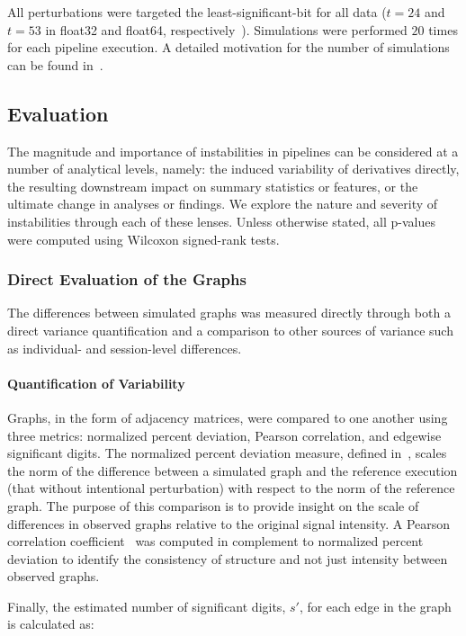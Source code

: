 \documentclass[fleqn,10pt]{SelfArx} %
\begin{document}
All perturbations were targeted the least-significant-bit for all data ($t=24$ and $t=53$ in float32 and float64,
respectively~\cite{Denis2016-wo}). Simulations were performed $20$ times for each pipeline execution. A detailed
motivation for the number of simulations can be found in~\cite{Sohier2018-ts}.

\subsection*{Evaluation}

The magnitude and importance of instabilities in pipelines can be considered at a number of analytical levels, namely:
the induced variability of derivatives directly, the resulting downstream impact on summary statistics or features, or
the ultimate change in analyses or findings. We explore the nature and severity of instabilities through each of these
lenses. Unless otherwise stated, all p-values were computed using Wilcoxon signed-rank tests.

\subsubsection*{Direct Evaluation of the Graphs}

The differences between simulated graphs was measured directly through both a direct variance quantification and a
comparison to other sources of variance such as individual- and session-level differences.

\paragraph{Quantification of Variability}
Graphs, in the form of adjacency matrices, were compared to one another using three metrics: normalized percent
deviation, Pearson correlation, and edgewise significant digits. The normalized percent deviation measure, defined
in~\cite{Kiar2020-lb}, scales the norm of the difference between a simulated graph and the reference execution (that
without intentional perturbation) with respect to the norm of the reference graph. The purpose of this comparison is
to provide insight on the scale of differences in observed graphs relative to the original signal intensity. A Pearson
correlation coefficient~\cite{Benesty2009-cb} was computed in complement to normalized percent deviation to identify
the consistency of structure and not just intensity between observed graphs.

Finally, the estimated number of significant digits, $s'$, for each edge in the graph is calculated as:
\end{document}
